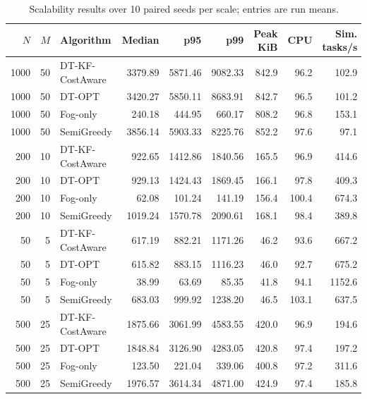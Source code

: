 \begin{table}[t]
\centering
\caption{Scalability results over 10 paired seeds per scale; entries are run means.}
\label{tab:independent_scalability}
\scriptsize
\begin{tabular}{rrlrrrrrr}
\toprule
$N$ & $M$ & Algorithm & Median & p95 & p99 & Peak KiB & CPU & Sim. tasks/s \\
\midrule
1000 & 50 & DT-KF-CostAware & 3379.89 & 5871.46 & 9082.33 & 842.9 & 96.2 & 102.9 \\
1000 & 50 & DT-OPT & 3420.27 & 5850.11 & 8683.91 & 842.7 & 96.5 & 101.2 \\
1000 & 50 & Fog-only & 240.18 & 444.95 & 660.17 & 808.2 & 96.8 & 153.1 \\
1000 & 50 & SemiGreedy & 3856.14 & 5903.33 & 8225.76 & 852.2 & 97.6 & 97.1 \\
200 & 10 & DT-KF-CostAware & 922.65 & 1412.86 & 1840.56 & 165.5 & 96.9 & 414.6 \\
200 & 10 & DT-OPT & 929.13 & 1424.43 & 1869.45 & 166.1 & 97.8 & 409.3 \\
200 & 10 & Fog-only & 62.08 & 101.24 & 141.19 & 156.4 & 100.4 & 674.3 \\
200 & 10 & SemiGreedy & 1019.24 & 1570.78 & 2090.61 & 168.1 & 98.4 & 389.8 \\
50 & 5 & DT-KF-CostAware & 617.19 & 882.21 & 1171.26 & 46.2 & 93.6 & 667.2 \\
50 & 5 & DT-OPT & 615.82 & 883.15 & 1116.23 & 46.0 & 92.7 & 675.2 \\
50 & 5 & Fog-only & 38.99 & 63.69 & 85.35 & 41.8 & 94.1 & 1152.6 \\
50 & 5 & SemiGreedy & 683.03 & 999.92 & 1238.20 & 46.5 & 103.1 & 637.5 \\
500 & 25 & DT-KF-CostAware & 1875.66 & 3061.99 & 4583.55 & 420.0 & 96.9 & 194.6 \\
500 & 25 & DT-OPT & 1848.84 & 3126.90 & 4283.05 & 420.8 & 97.4 & 197.2 \\
500 & 25 & Fog-only & 123.50 & 221.04 & 339.06 & 400.8 & 97.2 & 311.6 \\
500 & 25 & SemiGreedy & 1976.57 & 3614.34 & 4871.00 & 424.9 & 97.4 & 185.8 \\
\bottomrule
\end{tabular}
\end{table}
